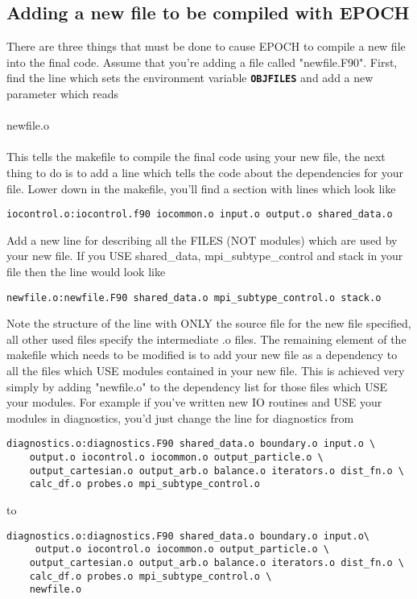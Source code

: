 \documentclass[12pt]{article}
\newcommand{\simpleboxverbatim}{\begin{Verbatim}[obeytabs=true,frame=single,
  framerule=0.5mm,rulecolor=\color{warwickmid}]}
\newcommand{\inlinecode}[1]{{\color{warwickred} \bf\texttt{#1}}}
\newcommand{\EPOCH}{{\color{warwickdark}\fontfamily{phv}\selectfont EPOCH} }
\begin{document}
\subsection{Adding a new file to be compiled with \EPOCH}
There are three things that must be done to cause \EPOCH to compile a new file
into the final code. Assume that you're adding a file called
"newfile.F90". First, find the line which sets the environment variable
\inlinecode{OBJFILES} and add a new parameter which reads\\
\\
newfile.o\\
\\ This tells the makefile to compile the final code using your new file, the
next thing to do is to add a line which tells the code about the dependencies
for your file. Lower down in the makefile, you'll find a section with lines
which look like
\simpleboxverbatim
iocontrol.o:iocontrol.f90 iocommon.o input.o output.o shared_data.o
\end{Verbatim}
Add a new line for describing all the FILES (NOT modules) which are used by
your new file. If you USE shared\_data, mpi\_subtype\_control and stack in
your file then the line would look like
\simpleboxverbatim
newfile.o:newfile.F90 shared_data.o mpi_subtype_control.o stack.o
\end{Verbatim}
Note the structure of the line with ONLY the source file for the new file
specified, all other used files specify the intermediate .o files. The
remaining element of the makefile which needs to be modified is to add your
new file as a dependency to all the files which USE modules contained in your
new file. This is achieved very simply by adding "newfile.o" to the dependency
list for those files which USE your modules. For example if you've written new
IO routines and USE your modules in diagnostics, you'd just change the line
for diagnostics from

\simpleboxverbatim
diagnostics.o:diagnostics.F90 shared_data.o boundary.o input.o \
	output.o iocontrol.o iocommon.o output_particle.o \
	output_cartesian.o output_arb.o balance.o iterators.o dist_fn.o \
	calc_df.o probes.o mpi_subtype_control.o
\end{Verbatim}
to
\simpleboxverbatim
diagnostics.o:diagnostics.F90 shared_data.o boundary.o input.o\
	 output.o iocontrol.o iocommon.o output_particle.o \
	output_cartesian.o output_arb.o balance.o iterators.o dist_fn.o \
	calc_df.o probes.o mpi_subtype_control.o \
	newfile.o
\end{Verbatim}
\end{document}
